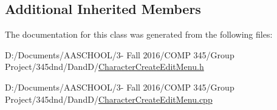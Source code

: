 \subsection*{Additional Inherited Members}


The documentation for this class was generated from the following files\+:\begin{DoxyCompactItemize}
\item 
D\+:/\+Documents/\+A\+A\+S\+C\+H\+O\+O\+L/3-\/ Fall 2016/\+C\+O\+M\+P 345/\+Group Project/345dnd/\+Dand\+D/\hyperlink{_character_create_edit_menu_8h}{Character\+Create\+Edit\+Menu.\+h}\item 
D\+:/\+Documents/\+A\+A\+S\+C\+H\+O\+O\+L/3-\/ Fall 2016/\+C\+O\+M\+P 345/\+Group Project/345dnd/\+Dand\+D/\hyperlink{_character_create_edit_menu_8cpp}{Character\+Create\+Edit\+Menu.\+cpp}\end{DoxyCompactItemize}
